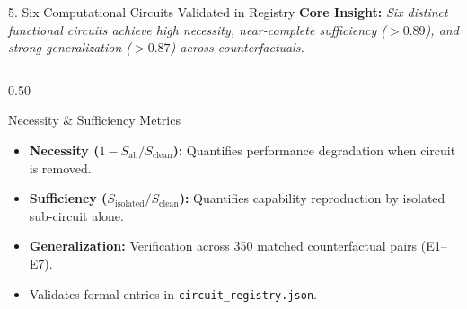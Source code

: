 \documentclass[aspectratio=169, 10pt]{beamer}
\begin{document}
\begin{frame}{5. Six Computational Circuits Validated in Registry}
  \textbf{Core Insight:} \textit{Six distinct functional circuits achieve high necessity, near-complete sufficiency ($>0.89$), and strong generalization ($>0.87$) across counterfactuals.}

  \vspace{0.2cm}
  \begin{columns}[T]
    \begin{column}{0.50\textwidth}
      \begin{block}{Necessity \& Sufficiency Metrics}
        \small
        \begin{itemize}
          \item \textbf{Necessity ($1 - S_{\mathrm{ab}} / S_{\mathrm{clean}}$):} Quantifies performance degradation when circuit is removed.
          \item \textbf{Sufficiency ($S_{\mathrm{isolated}} / S_{\mathrm{clean}}$):} Quantifies capability reproduction by isolated sub-circuit alone.
          \item \textbf{Generalization:} Verification across 350 matched counterfactual pairs (E1--E7).
          \item Validates formal entries in \texttt{circuit\_registry.json}.
        \end{itemize}
      \end{block}
    \end{column}


\end{columns}
\end{frame}
\end{document}
